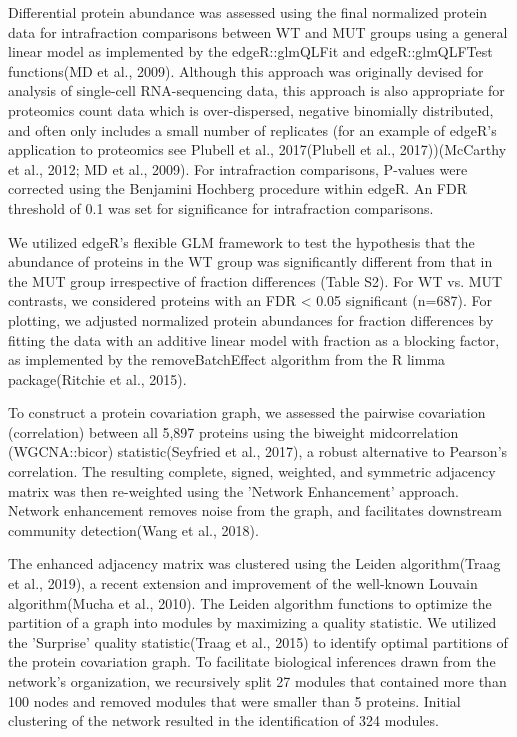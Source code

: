 Differential protein abundance was assessed using the final normalized protein
data for intrafraction comparisons between WT and MUT groups using a general
linear model as implemented by the edgeR::glmQLFit and edgeR::glmQLFTest
functions(MD et al., 2009). Although this approach was originally devised for
analysis of single-cell RNA-sequencing data, this approach is also appropriate
for proteomics count data which is over-dispersed, negative binomially
distributed, and often only includes a small number of replicates (for an
example of edgeR's application to proteomics see Plubell et al., 2017(Plubell et
al., 2017))(McCarthy et al., 2012; MD et al., 2009). For intrafraction
comparisons, P-values were corrected using the Benjamini Hochberg procedure
within edgeR. An FDR threshold of 0.1 was set for significance for intrafraction
comparisons.

We utilized edgeR's flexible GLM framework to test the hypothesis that the
abundance of proteins in the WT group was significantly different from that in
the MUT group irrespective of fraction differences (Table S2). For WT vs. MUT
contrasts, we considered proteins with an FDR < 0.05 significant (n=687). For
plotting, we adjusted normalized protein abundances for fraction differences by
fitting the data with an additive linear model with fraction as a blocking
factor, as implemented by the removeBatchEffect algorithm from the R limma
package(Ritchie et al., 2015).

To construct a protein covariation graph, we assessed the pairwise covariation
(correlation) between all 5,897 proteins using the biweight midcorrelation
(WGCNA::bicor) statistic(Seyfried et al., 2017), a robust alternative to
Pearson's correlation. The resulting complete, signed, weighted, and symmetric
adjacency matrix was then re-weighted using the 'Network Enhancement' approach.
Network enhancement removes noise from the graph, and facilitates downstream
community detection(Wang et al., 2018).

The enhanced adjacency matrix was clustered using the Leiden algorithm(Traag et
al., 2019), a recent extension and improvement of the well-known Louvain
algorithm(Mucha et al., 2010). The Leiden algorithm functions to optimize the
partition of a graph into modules by maximizing a quality statistic. We utilized
the 'Surprise' quality statistic(Traag et al., 2015) to identify optimal
partitions of the protein covariation graph. To facilitate biological inferences
drawn from the network's organization, we recursively split 27 modules that
contained more than 100 nodes and removed modules that were smaller than 5
proteins. Initial clustering of the network resulted in the identification of
324 modules.

